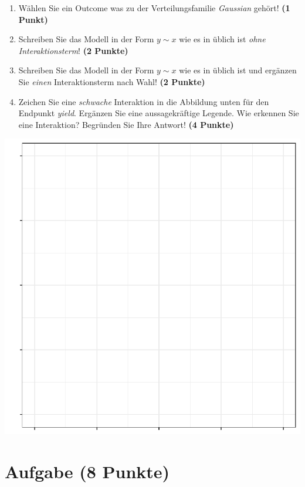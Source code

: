 \documentclass[a4paper, 10pt]{scrartcl}\usepackage[]{graphicx}\usepackage[]{color}
\makeatletter
\def\maxwidth{ %
  \ifdim\Gin@nat@width>\linewidth
    \linewidth
  \else
    \Gin@nat@width
  \fi
}
\makeatother
\begin{document}
\begin{enumerate}
\item W{\"a}hlen Sie ein Outcome was zu der Verteilungsfamilie
  \textit{Gaussian} geh{\"o}rt! \textbf{(1 Punkt)}
\item Schreiben Sie das Modell in der Form $y \sim x$ wie es in \Rlogo
  {\"u}blich ist \textit{ohne Interaktionsterm}! \textbf{(2 Punkte)}
\item Schreiben Sie das Modell in der Form $y \sim x$ wie es in \Rlogo
  {\"u}blich ist und erg{\"a}nzen Sie \textit{einen} Interaktionsterm nach Wahl! \textbf{(2 Punkte)} 
\item Zeichen Sie eine \textit{schwache}
  Interaktion in die Abbildung unten f{\"u}r den Endpunkt
  \textit{yield}. Erg{\"a}nzen Sie eine aussagekr{\"a}ftige Legende. Wie erkennen
  Sie eine Interaktion? Begr{\"u}nden Sie Ihre Antwort! \textbf{(4 Punkte)}
\end{enumerate}



{\centering \includegraphics[width=\maxwidth]{img/modeling-R-01-1} 

}


 
\clearpage

\section{Aufgabe \hfill (8 Punkte)}
\end{document}
